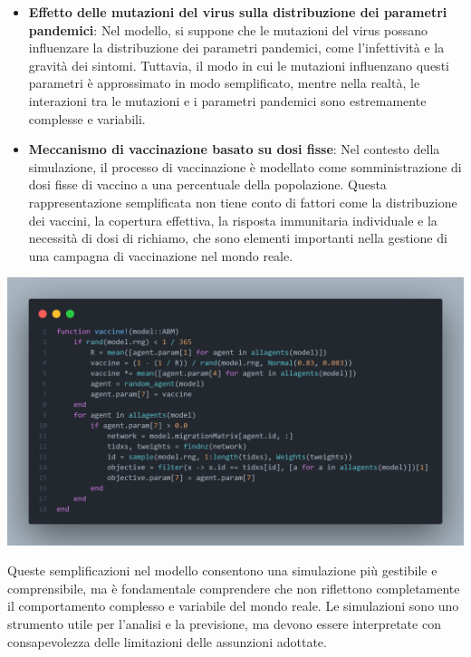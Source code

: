 \begin{itemize}
	\item \textbf{Effetto delle mutazioni del virus sulla distribuzione
	dei parametri pandemici}: Nel modello, si suppone che le mutazioni 
	del virus possano influenzare la distribuzione dei parametri 
	pandemici, come l'infettività e la gravità dei sintomi. 
	Tuttavia, il modo in cui le mutazioni influenzano questi parametri 
	è approssimato in modo semplificato, mentre nella realtà, 
	le interazioni tra le mutazioni e i parametri pandemici sono 
	estremamente complesse e variabili.
	\item \textbf{Meccanismo di vaccinazione basato su dosi fisse}: Nel 
	contesto della simulazione, il processo di vaccinazione è modellato 
	come somministrazione di dosi fisse di vaccino a una percentuale 
	della popolazione. Questa rappresentazione semplificata non tiene 
	conto di fattori come la distribuzione dei vaccini, la copertura 
	effettiva, la risposta immunitaria individuale e la necessità di 
	dosi di richiamo, che sono elementi importanti nella gestione di 
	una campagna di vaccinazione nel mondo reale.
\end{itemize}

\begin{minipage}{\linewidth}
	\centering
	\includegraphics[width=\textwidth]{img/vaccine.png}
	\label{fig:vaccine}
\end{minipage}

Queste semplificazioni nel modello consentono una simulazione più 
gestibile e comprensibile, ma è fondamentale comprendere che non 
riflettono completamente il comportamento complesso e variabile 
del mondo reale. Le simulazioni sono uno strumento utile per l'analisi 
e la previsione, ma devono essere interpretate con consapevolezza delle 
limitazioni delle assunzioni adottate.